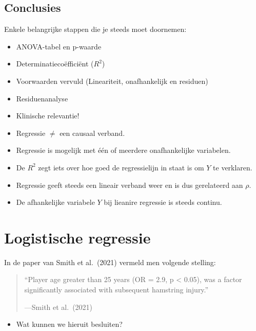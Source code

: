 \documentclass[
]{book}
\providecommand{\tightlist}{%
  \setlength{\itemsep}{0pt}\setlength{\parskip}{0pt}}
\theoremstyle{definition}
\theoremstyle{definition}
\theoremstyle{definition}
\theoremstyle{definition}
\theoremstyle{remark}
\begin{document}
\hypertarget{conclusies-1}{%
\section*{Conclusies}\label{conclusies-1}}


Enkele belangrijke stappen die je steeds moet doornemen:

\begin{itemize}
\tightlist
\item
  ANOVA-tabel en p-waarde
\item
  Determinatiecoëfficiënt (\(R^2\))
\item
  Voorwaarden vervuld (Lineariteit, onafhankelijk en residuen)
\item
  Residuenanalyse
\item
  Klinische relevantie!
\end{itemize}

\begin{itemize}
\tightlist
\item
  Regressie \(\neq\) een causaal verband.
\item
  Regressie is mogelijk met één of meerdere onafhankelijke variabelen.
\item
  De \(R^2\) zegt iets over hoe goed de regressielijn in staat is om \(Y\) te verklaren.
\item
  Regressie geeft steeds een lineair verband weer en is dus gerelateerd aan \(\rho\).
\item
  De afhankelijke variabele \(Y\) bij lieanire regressie is steeds continu.
\end{itemize}

\mainmatter

\hypertarget{logregr}{%
\chapter{Logistische regressie}\label{logregr}}

In de paper van Smith et al.~(2021) vermeld men volgende stelling:

\begin{quote}
``Player age greater than 25 years (OR = 2.9, p \textless{} 0.05), was a factor significantly associated with subsequent hamstring injury.''

---Smith et al.~(2021)
\end{quote}

\begin{itemize}
\tightlist
\item
  Wat kunnen we hieruit besluiten?
\end{itemize}
\end{document}
